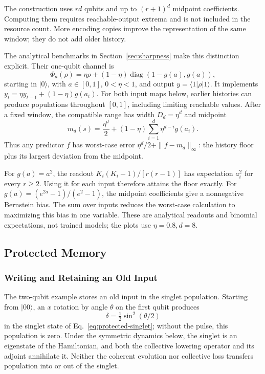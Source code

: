 The construction uses $rd$ qubits and up to $(r+1)^d$ midpoint coefficients.
Computing them requires reachable-output extrema and is not included in
the resource count. More encoding copies improve the representation of
the same window; they do not add older history.

The analytical benchmarks in Section~\ref{sec:sharpness} make this
distinction explicit. Their one-qubit channel is
\[
 \Phi_a(\rho)=\eta\rho+(1-\eta)\operatorname{diag}(1-g(a),g(a)),
\]
starting in $|0\rangle$, with $a\in[0,1]$, $0<\eta<1$, and output
$y=\langle1|\rho|1\rangle$. It implements
$y_t=\eta y_{t-1}+(1-\eta)g(a_t)$.
For both input maps below, earlier histories can produce populations
throughout $[0,1]$, including limiting reachable values. After a fixed
window, the compatible range has width $D_d=\eta^d$ and midpoint
\[
 m_d(s)=\frac{\eta^d}{2}+(1-\eta)\sum_{i=1}^d\eta^{d-i}g(a_i).
\]
Thus any predictor $f$ has worst-case error
$\eta^d/2+\|f-m_d\|_\infty$: the history floor plus its largest deviation
from the midpoint.

For $g(a)=a^2$, the readout $K_i(K_i-1)/[r(r-1)]$ has expectation $a_i^2$
for every $r\geq2$. Using it for each input therefore attains the floor
exactly. For $g(a)=(e^{2a}-1)/(e^2-1)$, the midpoint coefficients give a
nonnegative Bernstein bias. The sum over inputs reduces the worst-case
calculation to maximizing this bias in one variable. These are analytical
readouts and binomial expectations, not trained models; the plots use
$\eta=0.8,d=8$.

\subsection{Protected Memory}
\label{app:protected-calibration}

\subsubsection{Writing and Retaining an Old Input}
\label{app:protected-pulse}

The two-qubit example stores an old input in the singlet population.
Starting from $|00\rangle$, an $x$ rotation by angle $\theta$ on the first
qubit produces
\[
 \delta=\tfrac12\sin^2(\theta/2)
\]
in the singlet state of Eq.~\eqref{eq:protected-singlet}; without the pulse,
this population is zero. Under the symmetric dynamics below, the singlet
is an eigenstate of the Hamiltonian, and both the collective lowering
operator and its adjoint annihilate it. Neither the coherent evolution nor
collective loss transfers population into or out of the singlet.


